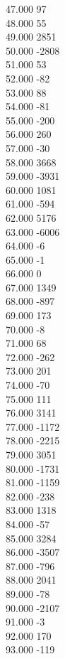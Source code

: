 { 47.000	97 \\
 48.000	55 \\
 49.000	2851 \\
 50.000	-2808 \\
 51.000	53 \\
 52.000	-82 \\
 53.000	88 \\
 54.000	-81 \\
 55.000	-200 \\
 56.000	260 \\
 57.000	-30 \\
 58.000	3668 \\
 59.000	-3931 \\
 60.000	1081 \\
 61.000	-594 \\
 62.000	5176 \\
 63.000	-6006 \\
 64.000	-6 \\
 65.000	-1 \\
 66.000	0 \\
 67.000	1349 \\
 68.000	-897 \\
 69.000	173 \\
 70.000	-8 \\
 71.000	68 \\
 72.000	-262 \\
 73.000	201 \\
 74.000	-70 \\
 75.000	111 \\
 76.000	3141 \\
 77.000	-1172 \\
 78.000	-2215 \\
 79.000	3051 \\
 80.000	-1731 \\
 81.000	-1159 \\
 82.000	-238 \\
 83.000	1318 \\
 84.000	-57 \\
 85.000	3284 \\
 86.000	-3507 \\
 87.000	-796 \\
 88.000	2041 \\
 89.000	-78 \\
 90.000	-2107 \\
 91.000	-3 \\
 92.000	170 \\
 93.000	-119 \\
}
